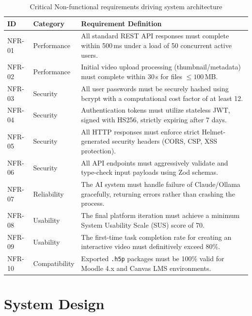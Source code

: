 \begin{table}[H]
  \centering
  \begin{tabularx}{\linewidth}{l >{\raggedright\arraybackslash}p{2.2cm} X}
    \toprule
    \textbf{ID} & \textbf{Category} & \textbf{Requirement Definition} \\
    \midrule
    NFR-01 & Performance & All standard REST API responses must complete within 500\,ms under a load of 50 concurrent active users. \\
    \addlinespace
    NFR-02 & Performance & Initial video upload processing (thumbnail/metadata) must complete within 30\,s for files $\leq 100$\,MB. \\
    \addlinespace
    NFR-03 & Security    & All user passwords must be securely hashed using bcrypt with a computational cost factor of at least 12. \\
    \addlinespace
    NFR-04 & Security    & Authentication tokens must utilize stateless JWT, signed with HS256, strictly expiring after 7 days. \\
    \addlinespace
    NFR-05 & Security    & All HTTP responses must enforce strict Helmet-generated security headers (CORS, CSP, XSS protection). \\
    \addlinespace
    NFR-06 & Security    & All API endpoints must aggressively validate and type-check input payloads using Zod schemas. \\
    \addlinespace
    NFR-07 & Reliability & The AI system must handle failure of Claude/Ollama gracefully, returning errors rather than crashing the process. \\
    \addlinespace
    NFR-08 & Usability   & The final platform iteration must achieve a minimum System Usability Scale (SUS) score of 70. \\
    \addlinespace
    NFR-09 & Usability   & The first-time task completion rate for creating an interactive video must definitively exceed 80\%. \\
    \addlinespace
    NFR-10 & Compatibility & Exported \texttt{.h5p} packages must be 100\% valid for Moodle 4.x and Canvas LMS environments. \\
    \bottomrule
  \end{tabularx}  
  \small
  \caption{Critical Non-functional requirements driving system architecture}
  \label{tab:nonfunc_reqs}
\end{table}

\section{System Design}
\label{sec:architecture}

